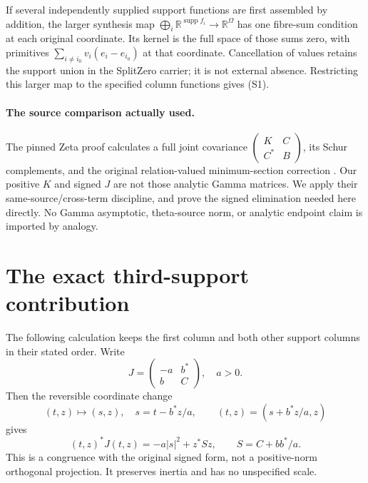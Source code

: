 If several independently supplied support functions are first assembled by
addition, the larger synthesis map
$\bigoplus_i\mathbb R^{\operatorname{supp}f_i}\to\mathbb R^\Omega$ has
one fibre-sum condition at each original coordinate. Its kernel is the full
space of those sums zero, with primitives
$\sum_{i\ne i_0}v_i(e_i-e_{i_0})$ at that coordinate. Cancellation of values
retains the support union in the SplitZero carrier; it is not external absence.
Restricting this larger map to the specified column functions gives (S1).

\paragraph{The source comparison actually used.}
The pinned Zeta proof calculates a full joint covariance
$\left(\begin{smallmatrix}K&C\\C^*&B\end{smallmatrix}\right)$, its Schur
complements, and the original relation-valued minimum-section correction
\cite[JSA12--JSA20]{Joint}. Our positive $K$ and signed $J$ are not those
analytic Gamma matrices. We apply their same-source/cross-term discipline,
and prove the signed elimination needed here directly. No Gamma asymptotic,
theta-source norm, or analytic endpoint claim is imported by analogy.

\section{The exact third-support contribution}
The following calculation keeps the first column and both other support
columns in their stated order. Write
\[
 J=\begin{pmatrix}-a&b^*\\b&C\end{pmatrix},\quad a>0.
\]
Then the reversible coordinate change
\[
 (t,z)\mapsto(s,z),\quad s=t-b^*z/a,
 \qquad(t,z)=(s+b^*z/a,z)
 \tag{S5}
\]
gives
\[
 (t,z)^*J(t,z)=-a|s|^2+z^*Sz,
 \qquad S=C+bb^*/a.
 \tag{S6}
\]
This is a congruence with the original signed form, not a positive-norm
orthogonal projection. It preserves inertia and has no unspecified scale.


